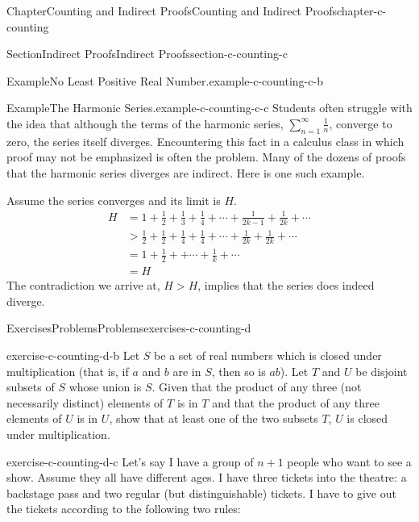 \documentclass[oneside,10pt,]{book}
\numberwithin{equation}{section}
\newcommand{\gt}{>}
\begin{document}
\begin{chapterptx}{Chapter}{Counting and Indirect Proofs}{}{Counting and Indirect Proofs}{}{}{chapter-c-counting}
\begin{sectionptx}{Section}{Indirect Proofs}{}{Indirect Proofs}{}{}{section-c-counting-c}
\begin{example}{Example}{No Least Positive Real Number.}{example-c-counting-c-b}
\end{example}
\begin{example}{Example}{The Harmonic Series.}{example-c-counting-c-c}%
%
Students often struggle with the idea that although the terms of the harmonic series, \(\sum_{n=1}^{\infty} \frac{1}{n}\), converge to zero, the series itself diverges. Encountering this fact in a calculus class in which proof may not be emphasized is often the problem.  Many of the dozens of proofs that the harmonic series diverges are indirect.  Here is one such example.%
\par
Assume the series converges and its limit is \(H\).%
\begin{equation*}
\begin{split}
H &= 1 + \frac{1}{2} + \frac{1}{3} + \frac{1}{4} +\cdots + \frac{1}{2k-1} + \frac{1}{2k} + \cdots\\
& \gt  \frac{1}{2} + \frac{1}{2} + \frac{1}{4} + \frac{1}{4} +\cdots + \frac{1}{2k} + \frac{1}{2k} + \cdots\\
& = 1 + \frac{1}{2} +  +\cdots + \frac{1}{k}  + \cdots\\
& = H
\end{split}
\end{equation*}
The contradiction we arrive at, \(H \gt H\), implies that the series does indeed diverge.%
\end{example}
\end{sectionptx}
%
%
\typeout{************************************************}
\typeout{************************************************}
%
\begin{exercises-section}{Exercises}{Problems}{}{Problems}{}{}{exercises-c-counting-d}
\begin{divisionexercise}{1}{}{}{exercise-c-counting-d-b}%
Let \(S\) be a set of real numbers which is closed under multiplication (that is, if \(a\) and \(b\) are in \(S\), then so is \(a b\)). Let \(T\) and \(U\) be disjoint subsets of \(S\) whose union is \(S\). Given that the product of any three (not necessarily distinct) elements of \(T\) is in \(T\) and that the product of any three elements of \(U\) is in \(U\), show that at least one of the two subsets \(T\), \(U\) is closed under multiplication.%
\end{divisionexercise}%
\begin{divisionexercise}{2}{}{}{exercise-c-counting-d-c}%
Let's say I have a group of \(n+1\) people who want to see a show. Assume they all have different ages.  I have three tickets into the theatre: a backstage pass and two regular (but distinguishable) tickets. I have to give out the tickets according to the following two rules:%

\end{divisionexercise}
\end{exercises-section}
\end{chapterptx}
\end{document}
